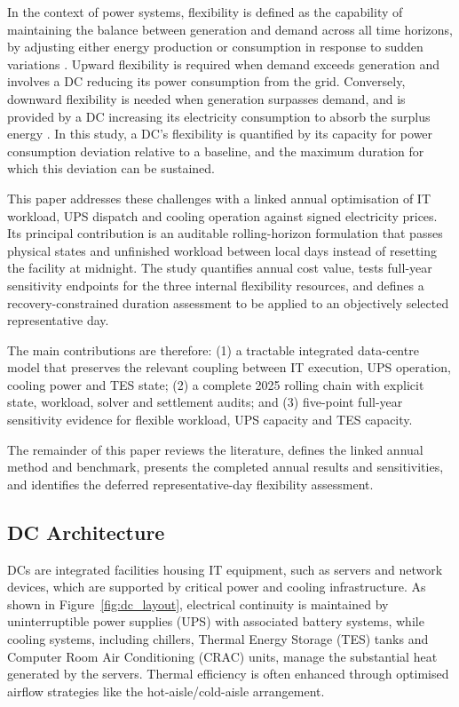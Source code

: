 \documentclass[lettersize,journal]{IEEEtran}
\begin{document}
In the context of power systems, flexibility is defined as the capability of maintaining the balance between generation and demand across all time horizons, by adjusting either energy production or consumption in response to sudden variations \cite{Centrica2020LEM, EEAACER2023Flex, neso2025future, Nosair2015TSTE}. Upward flexibility is required when demand exceeds generation and involves a DC reducing its power consumption from the grid. Conversely, downward flexibility is needed when generation surpasses demand, and is provided by a DC increasing its electricity consumption to absorb the surplus energy \cite{Centrica2020LEM, NG2017SNAPS}. In this study, a DC's flexibility is quantified by its capacity for power consumption deviation relative to a baseline, and the maximum duration for which this deviation can be sustained.

This paper addresses these challenges with a linked annual optimisation of IT
workload, UPS dispatch and cooling operation against signed electricity prices.
Its principal contribution is an auditable rolling-horizon formulation that
passes physical states and unfinished workload between local days instead of
resetting the facility at midnight. The study quantifies annual cost value,
tests full-year sensitivity endpoints for the three internal flexibility
resources, and defines a recovery-constrained duration assessment to be applied
to an objectively selected representative day.

The main contributions are therefore: (1) a tractable integrated data-centre
model that preserves the relevant coupling between IT execution, UPS operation,
cooling power and TES state; (2) a complete 2025 rolling chain with explicit
state, workload, solver and settlement audits; and (3) five-point full-year
sensitivity evidence for flexible workload, UPS capacity and TES capacity.

The remainder of this paper reviews the literature, defines the linked annual
method and benchmark, presents the completed annual results and sensitivities,
and identifies the deferred representative-day flexibility assessment.

\subsection{DC Architecture}
DCs are integrated facilities housing IT equipment, such as servers and network devices, which are supported by critical power and cooling infrastructure. As shown in Figure~\ref{fig:dc_layout}, electrical continuity is maintained by uninterruptible power supplies (UPS) with associated battery systems, while cooling systems, including chillers, Thermal Energy Storage (TES) tanks and  Computer Room Air Conditioning (CRAC) units, manage the substantial heat generated by the servers. Thermal efficiency is often enhanced through optimised airflow strategies like the hot-aisle/cold-aisle arrangement.
\end{document}
